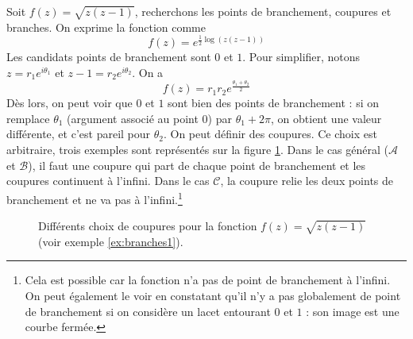 \begin{myexem}\label{ex:branches1}
    Soit $f(z) = \sqrt{z(z-1)}$, recherchons
    les points de branchement, coupures et branches.
    On exprime la fonction comme
    \[f(z) = e^{\frac{1}{2}\log(z(z-1))}\]
    Les candidats points de branchement sont $0$ et $1$.
    Pour simplifier, notons $z = r_1 e^{i\theta_1}$ et
    $z-1 = r_2 e^{i\theta_2}$.
    On a \[f(z) = r_1 r_2 e^{\frac{\theta_1+\theta_2}{2}}\]
    Dès lors, on peut voir que $0$ et $1$ sont bien des points
    de branchement : si on remplace $\theta_1$ (argument associé
    au point $0$) par $\theta_1 + 2\pi$, on obtient une valeur
    différente, et c'est pareil pour $\theta_2$.
    On peut définir des coupures. Ce choix est arbitraire, trois
    exemples sont représentés sur la figure \ref{fig:branches1}.
    Dans le cas général ($\mathcal{A}$ et $\mathcal{B}$),
    il faut une coupure qui part de chaque point
    de branchement et les coupures continuent à l'infini.
    Dans le cas $\mathcal{C}$, la coupure relie les deux points de
    branchement et ne va pas à l'infini.\footnote{
        Cela est possible car la fonction n'a pas de point de
        branchement à l'infini. On peut également le voir en constatant
        qu'il n'y a pas \og globalement \fg de point de branchement
        si on considère un lacet entourant $0$ et $1$ : son image est
        une courbe fermée.}

    \begin{figure}
    \centering
    \caption{Différents choix de coupures pour la fonction $f(z) = \sqrt{z(z-1)}$
        (voir exemple \ref{ex:branches1}).}
    \label{fig:branches1}
    \end{figure}
\end{myexem}

